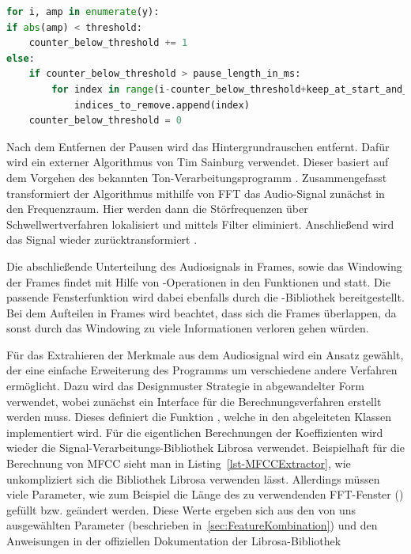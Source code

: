 \begin{lstlisting}[language=Python,numbers=none,caption=Remove Silence,label=lst-remove-silence]
for i, amp in enumerate(y):
if abs(amp) < threshold:
    counter_below_threshold += 1
else:
    if counter_below_threshold > pause_length_in_ms:
        for index in range(i-counter_below_threshold+keep_at_start_and_end, i-keep_at_start_and_end):
            indices_to_remove.append(index)
    counter_below_threshold = 0
\end{lstlisting}

Nach dem Entfernen der Pausen wird das Hintergrundrauschen entfernt.
Dafür wird ein externer Algorithmus von Tim Sainburg verwendet.
Dieser basiert auf dem Vorgehen des bekannten Ton-Verarbeitungsprogramm .
Zusammengefasst transformiert der Algorithmus mithilfe von \ac{FFT} das Audio-Signal zunächst in den Frequenzraum.
Hier werden dann die Störfrequenzen über Schwellwertverfahren lokalisiert und mittels Filter eliminiert.
Anschließend wird das Signal wieder zurücktransformiert \autocite[][]{sainburg_timsainbnoisereduce_2019}.

Die abschließende Unterteilung des Audiosignals in Frames, sowie das Windowing der Frames findet mit Hilfe von -Operationen in den Funktionen  und  statt.
Die passende Fensterfunktion wird dabei ebenfalls durch die -Bibliothek bereitgestellt.
Bei dem Aufteilen in Frames wird beachtet, dass sich die Frames überlappen, da sonst durch das Windowing zu viele Informationen verloren gehen würden.

Für das Extrahieren der Merkmale aus dem Audiosignal wird ein Ansatz gewählt, der eine einfache Erweiterung des Programms um verschiedene andere Verfahren ermöglicht.
Dazu wird das Designmuster Strategie in abgewandelter Form verwendet, wobei zunächst ein Interface für die Berechnungsverfahren erstellt werden muss.
Dieses definiert die Funktion , welche in den abgeleiteten Klassen implementiert wird.
Für die eigentlichen Berechnungen der Koeffizienten wird wieder die Signal-Verarbeitungs-Bibliothek Librosa verwendet.
Beispielhaft für die Berechnung von \ac{MFCC} sieht man in Listing~\ref{lst-MFCCExtractor}, wie unkompliziert sich die Bibliothek Librosa verwenden lässt.
Allerdings müssen viele Parameter, wie zum Beispiel die Länge des zu verwendenden FFT-Fenster () gefüllt bzw. geändert werden.
Diese Werte ergeben sich aus den von uns ausgewählten Parameter (beschrieben in~\ref{sec:FeatureKombination}) und den Anweisungen in der offiziellen Dokumentation der Librosa-Bibliothek \autocite[vgl. ][]{librosa_development_team_librosa_2023}


